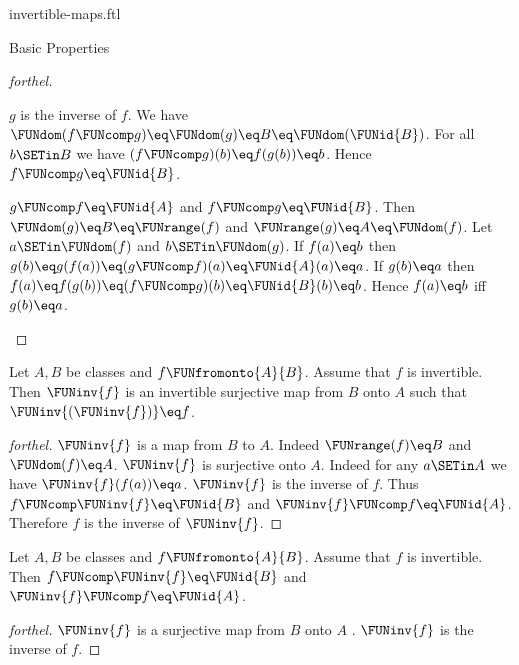 \documentclass{stex}
\begin{document}
\begin{smodule}{invertible-maps.ftl}
\begin{sfragment}{Basic Properties}
\begin{proof}[forthel]
\begin{case}{$g$ is the inverse of $f$.}
      We have
      $\FUNdom(f \FUNcomp g)
        \eq \FUNdom(g)
        \eq B
        \eq \FUNdom(\FUNid{B})$.
      For all $b \SETin B$ we have
      $(f \FUNcomp g)(b)
        \eq f(g(b))
        \eq b$.
      Hence $f \FUNcomp g \eq \FUNid{B}$.
    \end{case}

    \begin{case}{$g \FUNcomp f \eq \FUNid{A}$ and $f \FUNcomp g \eq \FUNid{B}$.}
      Then $\FUNdom(g)
        \eq B
        \eq \FUNrange(f)$
      and $\FUNrange(g)
        \eq A
        \eq \FUNdom(f)$.
      Let $a \SETin \FUNdom(f)$ and $b \SETin \FUNdom(g)$.
      If $f(a) \eq b$ then
      $g(b)
        \eq g(f(a))
        \eq (g \FUNcomp f)(a)
        \eq \FUNid{A}(a)
        \eq a$.
      If $g(b) \eq a$ then
      $f(a)
        \eq f(g(b))
        \eq (f \FUNcomp g)(b)
        \eq \FUNid{B}(b)
        \eq b$.
      Hence $f(a) \eq b$ iff $g(b) \eq a$.
    \end{case}
  \end{proof}

  \begin{proposition}[forthel,id=FOUNDATIONS_09_8414736098000896]
    Let $A, B$ be classes and $f \FUNfromonto{A}{B}$.
    Assume that $f$ is invertible.
    Then $\FUNinv{f}$ is an invertible surjective map from $B$ onto $A$ such that $\FUNinv{(\FUNinv{f})} \eq f$.
  \end{proposition}
  \begin{proof}[forthel]
    $\FUNinv{f}$ is a map from $B$ to $A$.
    Indeed $\FUNrange(f) \eq B$ and $\FUNdom(f) \eq A$.
    $\FUNinv{f}$ is surjective onto $A$.
    Indeed for any $a \SETin A$ we have $\FUNinv{f}(f(a)) \eq a$.
    $\FUNinv{f}$ is the inverse of $f$.
    Thus $f \FUNcomp \FUNinv{f} \eq \FUNid{B}$ and $\FUNinv{f} \FUNcomp f \eq \FUNid{A}$.
    Therefore $f$ is the inverse of $\FUNinv{f}$.
  \end{proof}

  \begin{proposition}[forthel,id=FOUNDATIONS_09_4577560740495360]
    Let $A, B$ be classes and $f \FUNfromonto{A}{B}$.
    Assume that $f$ is invertible.
    Then $f \FUNcomp \FUNinv{f} \eq \FUNid{B}$ and $\FUNinv{f} \FUNcomp f \eq \FUNid{A}$.
  \end{proposition}
  \begin{proof}[forthel]
    $\FUNinv{f}$ is a surjective map from $B$ onto $A$ .
    $\FUNinv{f}$ is the inverse of $f$.
  \end{proof}


\end{sfragment}
\end{smodule}
\end{document}
